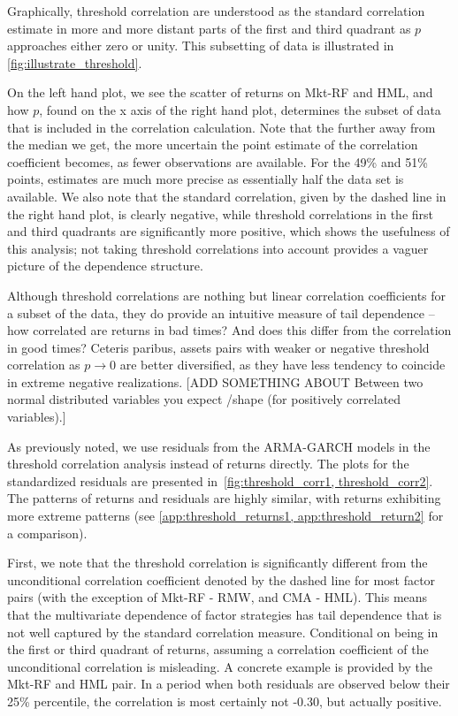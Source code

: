 Graphically, threshold correlation are understood as the standard correlation estimate in more and more distant parts of the first and third quadrant as $p$ approaches either zero or unity. This subsetting of data is illustrated in \autoref{fig:illustrate_threshold}. 

On the left hand plot, we see the scatter of returns on Mkt-RF and HML, and how $p$, found on the x axis of the right hand plot, determines the subset of data that is included in the correlation calculation. Note that the further away from the median we get, the more uncertain the point estimate of the correlation coefficient becomes, as fewer observations are available. For the 49\% and 51\% points, estimates are much more precise as essentially half the data set is available. We also note that the standard correlation, given by the dashed line in the right hand plot, is clearly negative, while threshold correlations in the first and third quadrants are significantly more positive, which shows the usefulness of this analysis; not taking threshold correlations into account provides a vaguer picture of the dependence structure.

Although threshold correlations are nothing but linear correlation coefficients for a subset of the data, they do provide an intuitive measure of tail dependence -- how correlated are returns in bad times? And does this differ from the correlation in good times? Ceteris paribus, assets pairs with weaker or negative threshold correlation as $p \rightarrow 0$ are better diversified, as they have less tendency to coincide in extreme negative realizations. [ADD SOMETHING ABOUT Between two normal distributed variables you expect /\-shape (for positively correlated variables).]


As previously noted, we use residuals from the ARMA-GARCH models in the threshold correlation analysis instead of returns directly. The plots for the standardized residuals are presented in~\autoref{fig:threshold_corr1, threshold_corr2}. The patterns of returns and residuals are highly similar, with returns exhibiting more extreme patterns (see \autoref{app:threshold_returns1, app:threshold_return2} for a comparison).

First, we note that the threshold correlation is significantly different from the unconditional correlation coefficient denoted by the dashed line for most factor pairs (with the exception of Mkt-RF - RMW, and CMA - HML). This means that the multivariate dependence of factor strategies has tail dependence that is not well captured by the standard correlation measure. Conditional on being in the first or third quadrant of returns, assuming a correlation coefficient of the unconditional correlation is misleading. A concrete example is provided by the Mkt-RF and HML pair. In a period when both residuals are observed below their 25\% percentile, the correlation is most certainly not -0.30, but actually positive.

